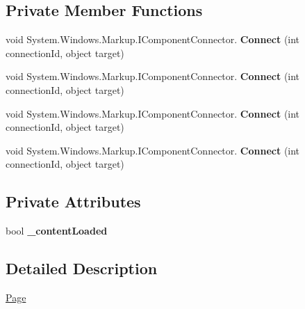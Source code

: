 \subsection*{Private Member Functions}
\begin{DoxyCompactItemize}
\item 
\mbox{\label{class_teacher_handbook_1_1_plugins_1_1_schedule_1_1_page_ae892b453201c76f4e733891f77163142}} 
void System.\+Windows.\+Markup.\+I\+Component\+Connector. {\bfseries Connect} (int connection\+Id, object target)
\item 
\mbox{\label{class_teacher_handbook_1_1_plugins_1_1_schedule_1_1_page_ae892b453201c76f4e733891f77163142}} 
void System.\+Windows.\+Markup.\+I\+Component\+Connector. {\bfseries Connect} (int connection\+Id, object target)
\item 
\mbox{\label{class_teacher_handbook_1_1_plugins_1_1_schedule_1_1_page_ae892b453201c76f4e733891f77163142}} 
void System.\+Windows.\+Markup.\+I\+Component\+Connector. {\bfseries Connect} (int connection\+Id, object target)
\item 
\mbox{\label{class_teacher_handbook_1_1_plugins_1_1_schedule_1_1_page_ae892b453201c76f4e733891f77163142}} 
void System.\+Windows.\+Markup.\+I\+Component\+Connector. {\bfseries Connect} (int connection\+Id, object target)
\end{DoxyCompactItemize}
\subsection*{Private Attributes}
\begin{DoxyCompactItemize}
\item 
\mbox{\label{class_teacher_handbook_1_1_plugins_1_1_schedule_1_1_page_a7ca28905c1fe3a47a61a71d1032d0c95}} 
bool {\bfseries \+\_\+content\+Loaded}
\end{DoxyCompactItemize}


\subsection{Detailed Description}
\mbox{\hyperlink{class_teacher_handbook_1_1_plugins_1_1_schedule_1_1_page}{Page}} 

